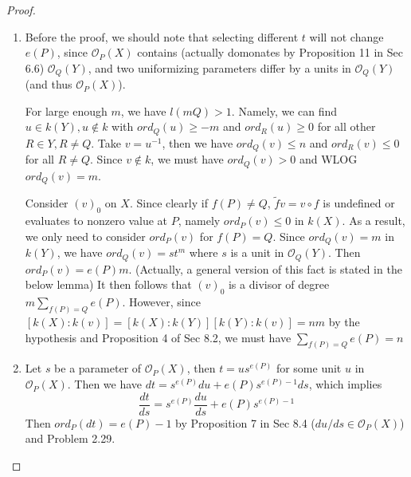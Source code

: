 \documentclass{solution}
\begin{document}
\begin{proof}
    \begin{enumerate}
        \item Before the proof, we should note that selecting different $t$ will not change $e(P)$, since $\mathcal{O}_{P}(X)$ contains (actually domonates by Proposition 11 in Sec 6.6) $\mathcal{O}_{Q}(Y)$, and two uniformizing parameters differ by a units in $\mathcal{O}_{Q}(Y)$ (and thus $\mathcal{O}_{P}(X)$).
        
        For large enough $m$, we have $l(mQ) \gt 1$. Namely, we can find $u \in k(Y), u \notin k$ with $ord_Q(u) \ge -m$ and $ord_R(u) \ge 0$ for all other $R \in Y, R \ne Q$. Take $v = u ^{-1}$, then we have $ord_Q(v) \le n$ and $ord_R(v) \le 0$ for all $R \ne Q$. Since $v \notin k$, we must have $ord_Q(v) \gt 0$ and WLOG $ord_Q(v) = m$.

        Consider $(v)_0$ on $X$. Since clearly if $f(P) \ne Q$, $\tilde{f} v = v \circ f$ is undefined or evaluates to nonzero value at $P$, namely $ord_P(v) \le 0$ in $k(X)$. As a result, we only need to consider $ord_P(v)$ for $f(P) = Q$. Since $ord_Q(v) = m$ in $k(Y)$, we have $ord_Q(v) = st^m$ where $s$ is a unit in $\mathcal{O}_{Q}(Y)$. Then $ord_P(v) = e(P)m$. (Actually, a general version of this fact is stated in the below lemma) It then follows that $(v)_0$ is a divisor of degree $m \sum\limits_{f(P) = Q} e(P)$. However, since $[k(X): k(v)] = [k(X):k(Y)][k(Y):k(v)] = n m$ by the hypothesis and Proposition 4 of Sec 8.2, we must have $\sum\limits_{f(P) = Q} e(P) = n$

        \item Let $s$ be a parameter of $\mathcal{O}_{P}(X)$, then $t = us^{e(P)}$ for some unit $u$ in $\mathcal{O}_{P}(X)$. Then we have $dt = s^{e(P)}du + e(P)s^{e(P) - 1} ds$, which implies
        $$\frac{dt}{ds} = s^{e(P)} \frac{du}{ds} + e(P)s^{e(P) - 1}$$
        Then $ord_P(dt) = e(P) - 1$ by Proposition 7 in Sec 8.4 ($du / ds \in \mathcal{O}_{P}(X)$) and Problem 2.29.


\end{enumerate}
\end{proof}
\end{document}
